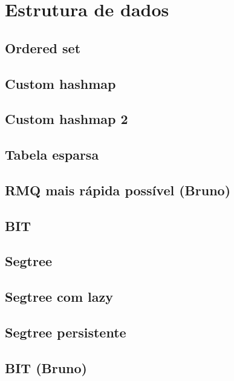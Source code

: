 \section{Estrutura de dados}

\subsection{Ordered set}


\subsection{Custom hashmap}


\subsection{Custom hashmap 2}


\subsection{Tabela esparsa}


\subsection{RMQ mais rápida possível (Bruno)}


\subsection{BIT}


\subsection{Segtree}


\subsection{Segtree com lazy}


\subsection{Segtree persistente}


\subsection{BIT (Bruno)}
